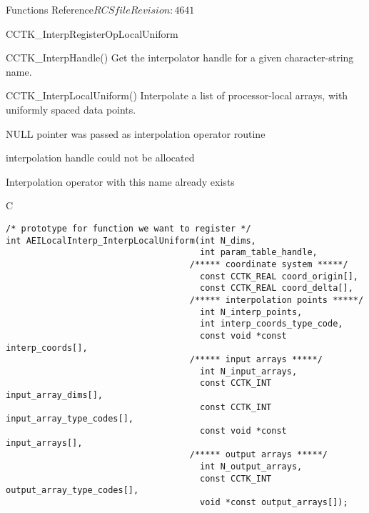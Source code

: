 \begin{cactuspart}{ Functions Reference}{$RCSfile$}{$Revision: 4641 $}
\begin{FunctionDescription}{CCTK\_InterpRegisterOpLocalUniform}
\begin{SeeAlsoSection}
\begin{SeeAlso}{CCTK\_InterpHandle()}
Get the interpolator handle for a given character-string name.
\end{SeeAlso}
\begin{SeeAlso}{CCTK\_InterpLocalUniform()}
Interpolate a list of processor-local arrays, with uniformly spaced
data points.
\end{SeeAlso}
\end{SeeAlsoSection}

\begin{ErrorSection}
\begin{Error}{-1}
NULL pointer was passed as interpolation operator routine
\end{Error}
\begin{Error}{-2}
interpolation handle could not be allocated
\end{Error}
\begin{Error}{-3}
Interpolation operator with this name already exists
\end{Error}
\end{ErrorSection}

\begin{ExampleSection}
\begin{Example}{C}
\begin{verbatim}
/* prototype for function we want to register */
int AEILocalInterp_InterpLocalUniform(int N_dims,
                                      int param_table_handle,
                                    /***** coordinate system *****/
                                      const CCTK_REAL coord_origin[],
                                      const CCTK_REAL coord_delta[],
                                    /***** interpolation points *****/
                                      int N_interp_points,
                                      int interp_coords_type_code,
                                      const void *const interp_coords[],
                                    /***** input arrays *****/
                                      int N_input_arrays,
                                      const CCTK_INT input_array_dims[],
                                      const CCTK_INT input_array_type_codes[],
                                      const void *const input_arrays[],
                                    /***** output arrays *****/
                                      int N_output_arrays,
                                      const CCTK_INT output_array_type_codes[],
                                      void *const output_arrays[]);


\end{verbatim}
\end{Example}
\end{ExampleSection}
\end{FunctionDescription}
\end{cactuspart}
